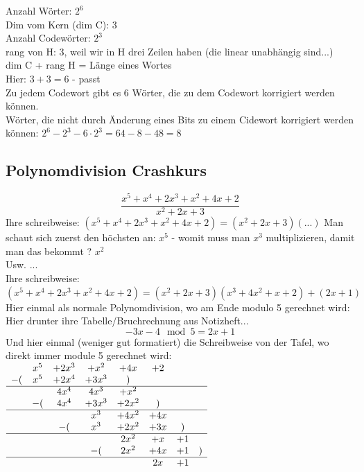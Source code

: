 \documentclass{article} %
\begin{document}
\begin{mybox}
 Anzahl Wörter: $2^6$ \\
 Dim vom Kern (dim C): 3 \\
 Anzahl Codewörter: $2^3$ \\
 rang von H: 3, weil wir in H drei Zeilen haben (die linear unabhängig sind...) \\
 dim C + rang H = Länge eines Wortes \\
 Hier: $3+3 =6$ - passt \\ \newline
 Zu jedem Codewort gibt es 6 Wörter, die zu dem Codewort korrigiert werden können. \\ \newline
Wörter, die nicht durch Änderung eines Bits zu einem Cidewort korrigiert werden können: $2^6 - 2^3 - 6\cdot 2^3 = 64 - 8 - 48 = 8$
\end{mybox} 

\subsection*{Polynomdivision Crashkurs}
\begin{mybox}
 \[
\frac{ x^5 + x^4 + 2x^3 + x^2 + 4x + 2 }{x^2 + 2x + 3} 
 \]
 Ihre schreibweise: $(x^5 + x^4 + 2x^3 + x^2 + 4x + 2) = (x^2 + 2x + 3) ( ...)$
 Man schaut sich zuerst den höchsten an: $x^5$ - womit muss man $x^3$ multiplizieren, damit man das bekommt ? $x^2$ \\
Usw. ... \\ \newline
Ihre schreibweise: $(x^5 + x^4 + 2x^3 + x^2 + 4x + 2) = (x^2 + 2x + 3) (x^3 + 4x^2 + x +2 ) + (2x +1)$
Hier einmal als normale Polynomdivision, wo am Ende modulo 5 gerechnet wird: \\
  Hier drunter ihre Tabelle/Bruchrechnung aus Notizheft... \\ \newline
{}
\[- 3x - 4 \mod 5 = 2x +1\]
Und hier einmal (weniger gut formatiert) die Schreibweise von der Tafel, wo direkt immer module 5 gerechnet wird:  \\ \newline 
$\begin{array}{cccccccc}
    & x^5 & +  2x^3 & + x^2 &+ 4x &+ 2\\
    -(&  x^5 & + 2x^4 & + 3x^3& )  \\ \hline
    & & 4x^4 & 4x^3 & + x^2 \\
    &  -( & 4x^4 & + 3x^3 & + 2x^2& ) \\ \hline
    & & & x^3 & + 4x^2 & + 4x \\
    & & -( & x^3 & + 2x^2 & + 3x& ) \\ \hline
    & & & & 2x^2 & + x & +1 \\
    & & & -( & 2x^2 & + 4x & +1 & ) \\ \hline
    & & & & & 2x & +1 
\end{array}$

\end{mybox}
\end{document}
